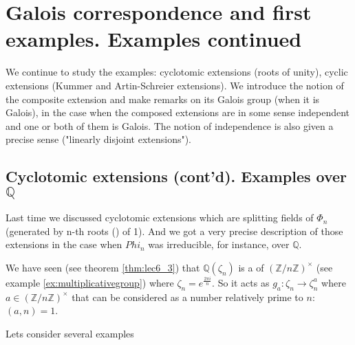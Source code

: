 \chapter{Galois correspondence and first examples. Examples continued}
We continue to study the examples: cyclotomic extensions (roots of
unity), cyclic extensions (Kummer and Artin-Schreier extensions). We
introduce the notion of the composite extension and make remarks on
its Galois group (when it is Galois), in the case when the composed
extensions are in some sense independent and one or both of them is
Galois. The notion of independence is also given a precise sense
("linearly disjoint extensions").


\section{Cyclotomic extensions (cont'd). Examples over $\mathbb{Q}$}

Last time we discussed cyclotomic extensions which are splitting
fields of $\Phi_n$ (generated by n-th roots
() of 1). And we got a very precise
description of those extensions in the case when $Phi_n$ was
irreducible, for instance, over $\mathbb{Q}$.

We have seen (see theorem \ref{thm:lec6_3}) that
$\mathbb{Q}\left(\zeta_n\right)$ is a  of
 $\left(\mathbb{Z}/n\mathbb{Z}\right)^\times$
(see example \ref{ex:multiplicativegroup}) 
where $\zeta_n = e^{\frac{2 \pi i}{n}}$. So it acts as $g_a: \zeta_n \to
\zeta_n^a$ where $a \in \left(\mathbb{Z}/n\mathbb{Z}\right)^\times$
that can be considered as a number relatively prime to $n$: $\left(a,
n\right) = 1$.

Lets consider several examples

